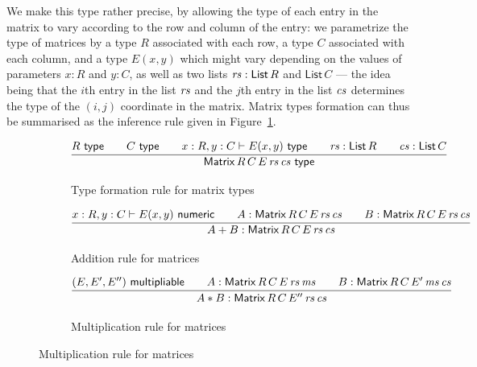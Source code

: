 \documentclass{IMEKO2024}
\newcommand{\istype}[1]{#1\ \textsf{type}}
\newcommand{\isadd}[1]{#1\ \textsf{numeric}}
\newcommand{\ismult}[3]{(#1, #2, #3)\ \textsf{multipliable}}
\newcommand{\Matrix}[5]{\mathsf{Matrix}\,#1\,#2\,#3\,#4\,#5}
\newcommand{\List}[1]{\mathsf{List}\,#1}
\newcommand{\param}{parametrize}
\begin{document}
We make this type rather precise, by allowing the type of each entry
in the matrix to vary according to the row and column of the entry:
%
we \param{} the type of matrices by a type $R$ associated with
each row, a type $C$ associated with each column, and a type $E(x,y)$
which might vary depending on the values of parameters $x : R$ and
$y : C$, as well as two lists $\rs : \List{R}$ and $\List{C}$ --- the
idea being that the $i$th entry in the list $\mathit{rs}$ and the $j$th entry
in the list $\mathit{cs}$ determines the type of the $(i, j)$ coordinate in the
matrix.
%
Matrix types formation can thus be summarised as the inference rule
given in Figure~\ref{fig:matrix_intro}.
%
\begin{figure}[th]
\begin{subfigure}{\textwidth}
  \begin{center}
    \[
      \infer{\istype{\Matrix{R}{C}{E}{\rs}{\cs}}}
      {
        \istype{R}
        &\quad
        \istype{C}
        &\quad
        x : R, y : C \vdash \istype{E(x,y)}
        &\quad
        \rs : \List{R}
        &\quad
        \cs : \List{C}
      }
    \]
  \end{center}
  \caption{Type formation rule for matrix types}
  \label{fig:matrix_intro}
\end{subfigure}
\hfill
\begin{subfigure}{\textwidth}
  \begin{center}
    \[
      \infer{A + B : \Matrix{R}{C}{E}{\rs}{\cs}}
      {
        x : R, y : C \vdash \isadd{E(x, y)}
        &\quad
        A : \Matrix{R}{C}{E}{\rs}{\cs}
        &\quad
        B : \Matrix{R}{C}{E}{\rs}{\cs}
      }
    \]
  \end{center}
  \caption{Addition rule for matrices}
  \label{fig:matrix_add}
\end{subfigure}
\hfill
\begin{subfigure}{\textwidth}
  \begin{center}
    \[
      \infer{A * B : \Matrix{R}{C}{E''}{\rs}{\cs}}
      {
        \ismult{E}{E'}{E''}
        &\quad
        A : \Matrix{R}{C}{E}{\rs}{\ms}
        &\quad
        B : \Matrix{R}{C}{E'}{\ms}{\cs}
      }
    \]
  \end{center}
  \caption{Multiplication rule for matrices}
  \label{fig:matrix_mul}
\end{subfigure}
\label{fig:matrix_rules}
\end{figure}
\end{document}
